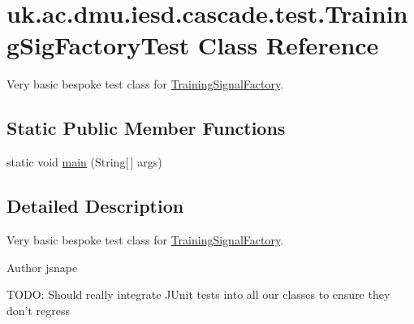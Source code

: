 \hypertarget{classuk_1_1ac_1_1dmu_1_1iesd_1_1cascade_1_1test_1_1_training_sig_factory_test}{\section{uk.\-ac.\-dmu.\-iesd.\-cascade.\-test.\-Training\-Sig\-Factory\-Test Class Reference}
\label{classuk_1_1ac_1_1dmu_1_1iesd_1_1cascade_1_1test_1_1_training_sig_factory_test}
}


Very basic bespoke test class for \hyperlink{classuk_1_1ac_1_1dmu_1_1iesd_1_1cascade_1_1util_1_1profilegenerators_1_1_training_signal_factory}{Training\-Signal\-Factory}.  


\subsection*{Static Public Member Functions}
\begin{DoxyCompactItemize}
\item 
static void \hyperlink{classuk_1_1ac_1_1dmu_1_1iesd_1_1cascade_1_1test_1_1_training_sig_factory_test_a8684a2c67f60844d1f37509bd79c93bc}{main} (String\mbox{[}$\,$\mbox{]} args)
\end{DoxyCompactItemize}


\subsection{Detailed Description}
Very basic bespoke test class for \hyperlink{classuk_1_1ac_1_1dmu_1_1iesd_1_1cascade_1_1util_1_1profilegenerators_1_1_training_signal_factory}{Training\-Signal\-Factory}. 

\begin{DoxyAuthor}{Author}
jsnape
\end{DoxyAuthor}
T\-O\-D\-O\-: Should really integrate J\-Unit tests into all our classes to ensure they don't regress 

